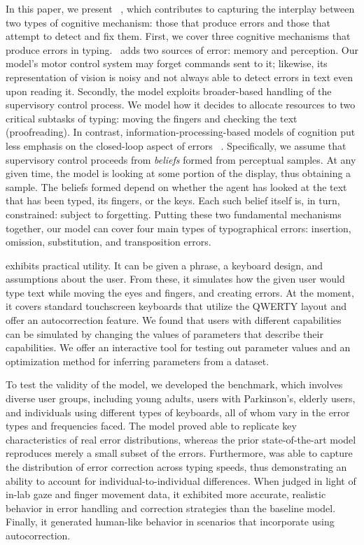 In this paper, we present ~\name, which contributes to capturing the interplay between two types of cognitive mechanism: those that produce errors and those that attempt to detect and fix them.
%
First, we cover three cognitive mechanisms that produce errors in typing.
%
~\name adds two sources of error: memory and perception. 
Our model's motor control system may forget commands sent to it;
likewise, its representation of vision is noisy and not always able to detect errors in text even upon reading it.
%
Secondly, 
the model exploits broader-based handling of the supervisory control process.
We model how it decides to allocate resources to two critical subtasks of typing: moving the fingers and checking the text (proofreading).
In contrast, information-processing-based models of cognition put less emphasis on the closed-loop aspect of errors ~\cite{wickens2021engineering}.
Specifically, we assume that supervisory control proceeds from \emph{beliefs} formed from perceptual samples.
At any given time, the model is looking at some portion of the display, thus obtaining a sample.
The beliefs formed depend on whether the agent has looked at the text that has been typed, its fingers, or the keys. Each such belief itself is, in turn, constrained: subject to forgetting.
%
Putting these two fundamental mechanisms together, our model can cover four main types of typographical errors: insertion, omission, substitution, and transposition errors.


\name exhibits practical utility. 
It can be given a phrase, a keyboard design, and assumptions about the user. From these, it simulates how the given user would type text while moving the eyes and fingers, and creating errors. 
At the moment, it covers standard touchscreen keyboards that utilize the QWERTY layout and offer an autocorrection feature.
We found that users with different capabilities can be simulated by changing the values of parameters that describe their capabilities. 
%
We offer an interactive tool for testing out parameter values and an optimization method for inferring parameters from a dataset.

%
To test the validity of the model, 
we developed the \benchmark benchmark, which involves diverse user groups, including young adults, users with Parkinson's, elderly users, and individuals using different types of keyboards, all of whom vary in the error types and frequencies faced. 
The model proved able to replicate key characteristics of real  error distributions, whereas the prior state-of-the-art model reproduces merely a small subset of the errors.
Furthermore, \name was able to capture the distribution of error correction across typing speeds, thus demonstrating an ability to account for individual-to-individual differences. When judged in light of in-lab gaze and finger movement data, it exhibited more accurate, realistic behavior in error handling and correction strategies than the baseline model.
Finally, it generated human-like behavior in scenarios that incorporate using autocorrection. 

